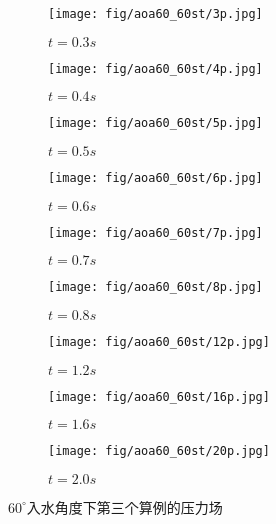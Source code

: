 \begin{figure}[!htp]
  \centering

  \begin{subfigure}{0.25\textwidth}
    \centering
    \texttt{[image: fig/aoa60\_60st/3p.jpg]}
    \caption{$t = 0.3s$}
  \end{subfigure}
  \hspace{1cm}
  \begin{subfigure}{0.25\textwidth}
    \centering
    \texttt{[image: fig/aoa60\_60st/4p.jpg]}
    \caption{$t = 0.4s$}
  \end{subfigure}
  \hspace{1cm}
  \begin{subfigure}{0.25\textwidth}
    \centering
    \texttt{[image: fig/aoa60\_60st/5p.jpg]}
    \caption{$t = 0.5s$}
  \end{subfigure}

  \quad

  \begin{subfigure}{0.25\textwidth}
    \centering
    \texttt{[image: fig/aoa60\_60st/6p.jpg]}
    \caption{$t = 0.6s$}
  \end{subfigure}
  \hspace{1cm}
  \begin{subfigure}{0.25\textwidth}
    \centering
    \texttt{[image: fig/aoa60\_60st/7p.jpg]}
    \caption{$t = 0.7s$}
  \end{subfigure}
  \hspace{1cm}
  \begin{subfigure}{0.25\textwidth}
    \centering
    \texttt{[image: fig/aoa60\_60st/8p.jpg]}
    \caption{$t = 0.8s$}
  \end{subfigure}

  \quad 

  \begin{subfigure}{0.25\textwidth}
    \centering
    \texttt{[image: fig/aoa60\_60st/12p.jpg]}
    \caption{$t = 1.2s$}
  \end{subfigure}
  \hspace{1cm}
  \begin{subfigure}{0.25\textwidth}
    \centering
    \texttt{[image: fig/aoa60\_60st/16p.jpg]}
    \caption{$t = 1.6s$}
  \end{subfigure}
  \hspace{1cm}
  \begin{subfigure}{0.25\textwidth}
    \centering
    \texttt{[image: fig/aoa60\_60st/20p.jpg]}
    \caption{$t = 2.0s$}
  \end{subfigure}

  \caption{$60^\circ$入水角度下第三个算例的压力场}
  \label{fig:detail_p}
\end{figure}

